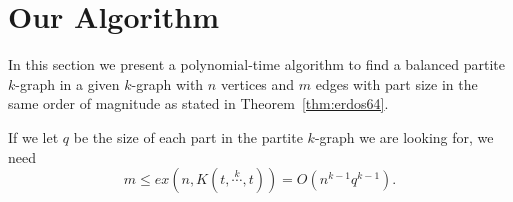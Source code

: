 \section{Our Algorithm}\label{sec:algorithm}

In this section we present a polynomial-time algorithm to find a balanced partite $k$-graph in a given $k$-graph
with $n$ vertices and $m$ edges with part size in the same order of magnitude as stated in
Theorem~\ref{thm:erdos64}.

\begin{remark}
    If we let $q$ be the size of each part in the partite $k$-graph we are looking for, we need
    \[
        m \leq ex(n, K(t, \overset{k}{\cdots}, t)) = O(n^{k-1}q^{k-1}).
    \]
\end{remark}